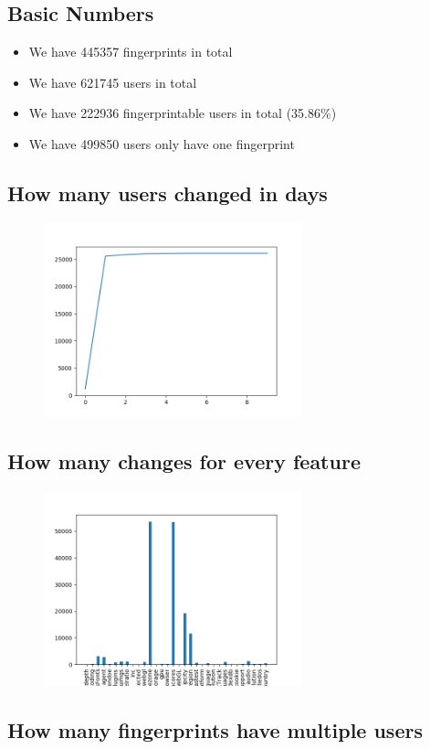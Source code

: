 \documentclass[10pt, conference, compsocconf]{IEEEtran}
\begin{document}
\subsection{Basic Numbers}
\begin{itemize}\item We have 445357 fingerprints in total\item We have 621745 users in total\item We have 222936 fingerprintable users in total (35.86\%)\item We have 499850 users only have one fingerprint \end{itemize}\subsection{How many users changed in days}
\begin{figure}[H]\centering\includegraphics[width=75mm,scale=0.5]{BasedonCookiechangebytime}\end{figure}\subsection{How many changes for every feature}
\begin{figure}[H]\centering\includegraphics[width=75mm,scale=0.5]{BasedonCookiefeaturechange}\end{figure}\subsection{How many fingerprints have multiple users}
\end{document}
